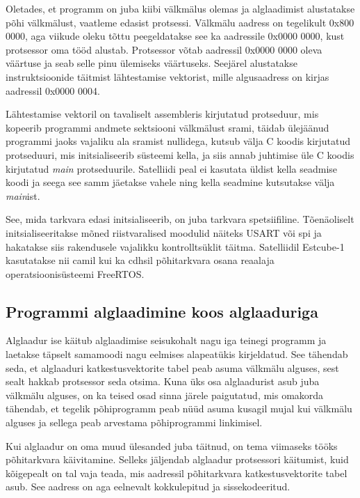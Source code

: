 \documentclass[12pt,a4paper]{article}
\begin{document}
Oletades, et programm on juba kiibi välkmälus olemas ja alglaadimist
alustatakse põhi välkmälust, vaatleme edasist protsessi. Välkmälu aadress on
tegelikult 0x800 0000, aga viikude oleku tõttu peegeldatakse see ka aadressile
0x0000 0000, kust protsessor oma tööd alustab.  Protsessor võtab aadressil
0x0000 0000 oleva väärtuse ja seab selle pinu ülemiseks väärtuseks. Seejärel
alustatakse instruktsioonide täitmist lähtestamise vektorist, mille
algusaadress on kirjas aadressil 0x0000 0004. \cite{f1rm}

Lähtestamise vektoril on tavaliselt assembleris kirjutatud protseduur, mis
kopeerib programmi andmete sektsiooni välkmälust \gls{sram}i, täidab ülejäänud
programmi jaoks vajaliku ala \gls{sram}ist nullidega, kutsub välja C koodis
kirjutatud protseduuri, mis initsialiseerib süsteemi kella, ja siis annab
juhtimise üle C koodis kirjutatud \textit{main} protseduurile. Satelliidi peal
ei kasutata üldist kella seadmise koodi ja seega see samm jäetakse vahele ning
kella seadmine kutsutakse välja \textit{main}ist.

See, mida tarkvara edasi initsialiseerib, on juba tarkvara spetsiifiline.
Tõenäoliselt initsialiseeritakse mõned riistvaralised moodulid näiteks USART või
\gls{spi} ja hakatakse siis rakendusele vajalikku kontrolltsüklit täitma.
Satelliidil Estcube-1 kasutatakse nii \gls{cam}il kui ka \gls{cdhs}il
põhitarkvara osana reaalaja operatsioonisüsteemi FreeRTOS.

\subsection{Programmi alglaadimine koos alglaaduriga}
Alglaadur ise käitub alglaadimise seisukohalt nagu iga teinegi programm ja
laetakse täpselt samamoodi nagu eelmises alapeatükis kirjeldatud. See tähendab
seda, et alglaaduri katkestusvektorite tabel peab asuma välkmälu alguses, sest
sealt hakkab protsessor seda otsima. Kuna üks osa alglaadurist asub juba
välkmälu alguses, on ka teised osad sinna järele paigutatud, mis omakorda
tähendab, et tegelik põhiprogramm peab nüüd asuma kusagil mujal kui välkmälu
alguses ja sellega peab arvestama põhiprogrammi linkimisel.

Kui alglaadur on oma muud ülesanded juba täitnud, on tema viimaseks tööks
põhitarkvara käivitamine. Selleks jäljendab alglaadur protsessori käitumist,
kuid kõigepealt on tal vaja teada, mis aadressil põhitarkvara katkestusvektorite
tabel asub. See aadress on aga eelnevalt kokkulepitud ja sissekodeeritud.
\end{document}
